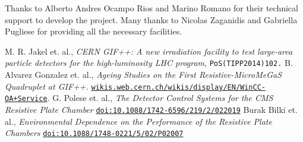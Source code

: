 \documentclass[a4paper,11pt]{article}
\begin{document}
\acknowledgments
Thanks to Alberto Andres Ocampo Rios and Marino Romano for their technical support to develop the project. Many thanks to Nicolas Zaganidis and Gabriella Pugliese for providing all the necessary facilities.  


\begin{thebibliography}{99}
 M. R. Jakel et. al., \emph{CERN GIF++: A new irradiation facility to test large-area particle detectors for the high-luminosity LHC program},
\texttt{PoS(TIPP2014)102.} 
 B. Alvarez Gonzalez et. al., \emph{Ageing Studies on the First Resistive-MicroMeGaS Quadruplet at GIF++.}
 \href{https://wikis.web.cern.ch/wikis/display/EN/WinCC-OA+Service}{\texttt{wikis.web.cern.ch/wikis/display/EN/WinCC-OA+Service}}.
G. Polese et. al., \emph{The Detector Control Systems for the CMS Resistive Plate Chamber}
\href{http://iopscience.iop.org/article/10.1088/1742-6596/219/2/022019/pdf}{\texttt{doi:10.1088/1742-6596/219/2/022019}}
Burak Bilki et. al., \emph{Environmental Dependence on the Performance of the Resistive Plate Chambers}
\href{http://iopscience.iop.org/article/10.1088/1748-0221/5/02/P02007/pdf}{\texttt{doi:10.1088/1748-0221/5/02/P02007}}

\end{thebibliography}
\end{document}
